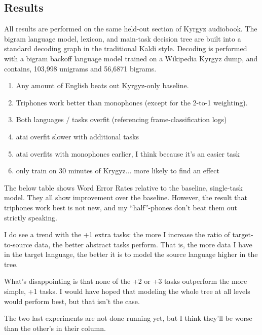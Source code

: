 \documentclass[a4paper]{article}
\begin{document}
\subsection{Results}


All results are performed on the same held-out section of Kyrgyz audiobook. The bigram language model, lexicon, and main-task decision tree are built into a standard decoding graph in the traditional Kaldi style. Decoding is performed with a bigram backoff language model trained on a Wikipedia Kyrgyz dump, and contains, 103,998 unigrams and 56,6871 bigrams.


\begin{enumerate}
\item Any amount of English beats out Kyrgyz-only baseline.
\item Triphones work better than monophones (except for the 2-to-1 weighting).
\item Both languages / tasks overfit (referencing frame-classification logs)
\item atai overfit slower with additional tasks
\item atai overfits with monophones earlier, I think because it's an easier task
\item only train on 30 minutes of Krygyz... more likely to find an effect
\end{enumerate}


The below table shows Word Error Rates relative to the baseline, single-task model. They all show improvement over the baseline. However, the result that triphones work best is not new, and my ``half''-phones don't beat them out strictly speaking.

I do see a trend with the +1 extra tasks: the more I increase the ratio of target-to-source data, the better abstract tasks perform. That is, the more data I have in the target language, the better it is to model the source language higher in the tree.

What's disappointing is that none of the +2 or +3 tasks outperform the more simple, +1 tasks. I would have hoped that modeling the whole tree at all levels would perform best, but that isn't the case.

The two last experiments are not done running yet, but I think they'll be worse than the other's in their column.
\end{document}
